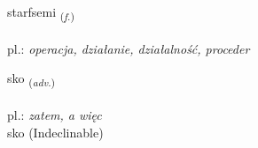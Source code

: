 \documentclass[frontgrid, backgrid]{flacards}\usepackage[]{graphicx}\usepackage[]{xcolor}
\begin{document}
\renewcommand{\blhead}{\vskip5pt {\small\bfseries\footnotesize Nafnorð | Noun }}
\renewcommand{\bcfoot}{\vskip5pt \hspace{2pt}{\small\bfseries\footnotesize 1K}}


{starfsemi \small{\textsubscript{(\textit{f.})}} \\[1ex] %
\textphonetic{[starfsɛmɪ]} \\
pl.: \emph{operacja, działanie, działalność, proceder} \\  [2ex]
\renewcommand*{\arraystretch}{0.8}
}


\renewcommand{\flhead}{\vskip5pt \fboxsep=0pt {\small\bfseries\footnotesize Atviksorð | Adverb}}
\renewcommand{\fcfoot}{\vskip5pt \fboxsep=0pt \hspace{2pt}{\small\bfseries\footnotesize 1K}}

\renewcommand{\blhead}{\vskip5pt {\small\bfseries\footnotesize Atviksorð | Adverb }}
\renewcommand{\bcfoot}{\vskip5pt \hspace{2pt}{\small\bfseries\footnotesize 1K}}


{sko \small{\textsubscript{(\textit{adv.})}} \\[1ex]
\textphonetic{[skɔː]} \\
pl.: \emph{zatem, a więc} \\  [2ex]
sko (Indeclinable)}

\renewcommand{\flhead}{\vskip5pt \fboxsep=0pt {\small\bfseries\footnotesize Nafnorð | Noun}}
\renewcommand{\fcfoot}{\vskip5pt \fboxsep=0pt \hspace{2pt}{\small\bfseries\footnotesize 1K}}

\renewcommand{\blhead}{\vskip5pt {\small\bfseries\footnotesize Nafnorð | Noun }}
\renewcommand{\bcfoot}{\vskip5pt \hspace{2pt}{\small\bfseries\footnotesize 1K}}
\end{document}
